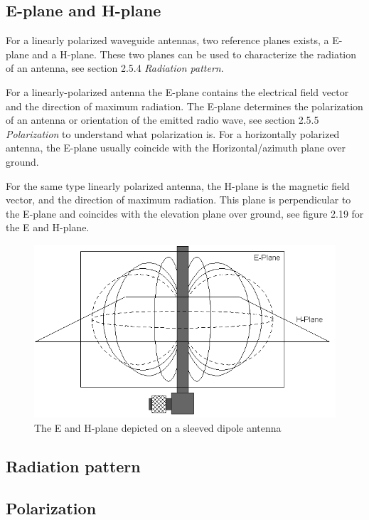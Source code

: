 \subsection{E-plane and H-plane}
For a linearly polarized waveguide antennas, two reference planes exists, a E-plane and a H-plane. These two planes can be used to characterize the radiation of an antenna, see section 2.5.4 \textit{Radiation pattern}.

For a linearly-polarized antenna the E-plane contains the electrical field vector and the direction of maximum radiation. The E-plane determines the polarization of an antenna or orientation of the emitted radio wave, see section 2.5.5 \textit{Polarization} to understand what polarization is. For a horizontally polarized antenna, the E-plane usually coincide with the Horizontal/azimuth plane over ground. 

For the same type linearly polarized antenna, the H-plane is the magnetic field vector, and the direction of maximum radiation. This plane is perpendicular to the E-plane and coincides with the elevation plane over ground, see figure 2.19 for the E and H-plane. 

\begin{figure}[h]
\hspace{-1cm}
\includegraphics[scale=0.8]{figures/EH_Plane.png}
\caption{The E and H-plane depicted on a sleeved dipole antenna \cite{EH-plane}}
\end{figure}

\subsection{Radiation pattern}
\subsection{Polarization}

